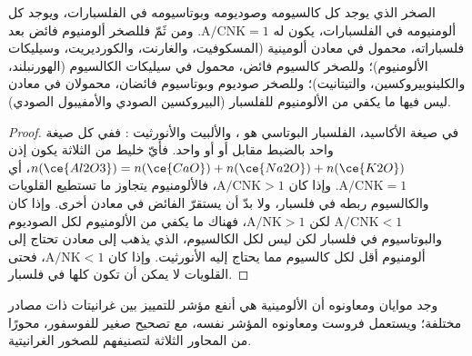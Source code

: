 \begin{proposition}\label{prop:b2:crustal-melting:feldspar}
الصخر الذي يوجد كل كالسيومه وصوديومه وبوتاسيومه في الفلسبارات، ويوجد
كل ألومنيومه في الفلسبارات، يكون له $\mathrm{A/CNK} = 1$. ومن ثَمّ فللصخر  ألومنيوم
فائض بعد فلسباراته، محمول في معادن ألومينية (المسكوفيت، والغارنت، والكورديريت،
وسيليكات الألومنيوم)؛ وللصخر  كالسيوم فائض، محمول في سيليكات الكالسيوم
(الهورنبلند، والكلينوبيروكسين، والتيتانيت)؛ وللصخر  صوديوم وبوتاسيوم
فائضان، محمولان في معادن ليس فيها ما يكفي من الألومنيوم للفلسبار (البيروكسين الصودي
والأمفيبول الصودي).
\end{proposition}

\begin{proof}
في صيغة الأكاسيد، الفلسبار البوتاسي هو ، والألبيت 
والأنورثيت : ففي كل صيغة  واحد بالضبط مقابل
 أو  أو  واحد. فأيّ خليط من الثلاثة يكون إذن $n(\ce{Al2O3}) =
n(\ce{CaO}) + n(\ce{Na2O}) + n(\ce{K2O})$، أي $\mathrm{A/CNK} = 1$. وإذا كان
$\mathrm{A/CNK} > 1$، فالألومنيوم يتجاوز ما تستطيع القلويات والكالسيوم ربطه في
فلسبار، ولا بدّ أن يستقرّ الفائض في معادن أخرى. وإذا كان $\mathrm{A/CNK} < 1$ لكن
$\mathrm{A/NK} > 1$، فهناك ما يكفي من الألومنيوم لكل الصوديوم والبوتاسيوم في
فلسبار لكن ليس لكل الكالسيوم، الذي يذهب إلى معادن تحتاج إلى ألومنيوم أقل
لكل كالسيوم مما يحتاج إليه الأنورثيت. وإذا كان $\mathrm{A/NK} < 1$، فحتى القلويات لا يمكن أن تكون كلها في
فلسبار.
\end{proof}

وجد موايان ومعاونوه أن الألومينية هي أنفع مؤشر للتمييز بين غرانيتات
ذات مصادر مختلفة؛ ويستعمل فروست ومعاونوه المؤشر نفسه، مع تصحيح صغير
للفوسفور، محورًا من المحاور الثلاثة لتصنيفهم للصخور
الغرانيتية.

